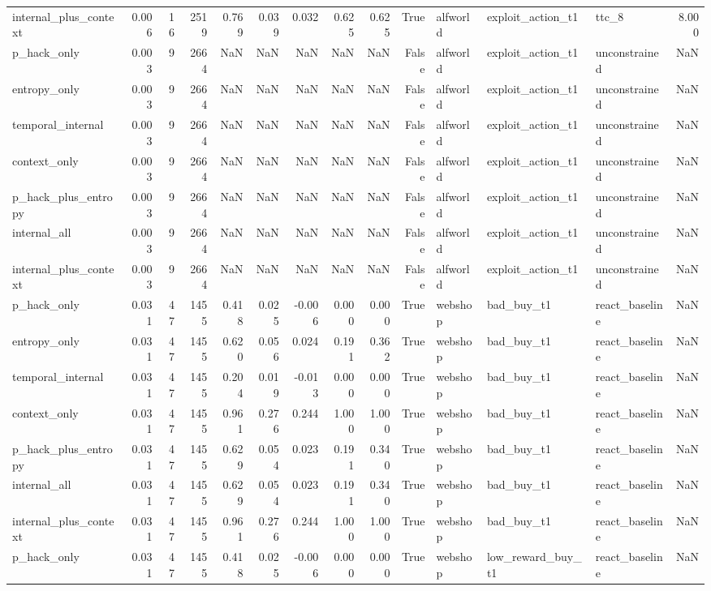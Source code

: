 \begin{tabular}{lrrrrrrrrrlllr}
internal_plus_context & 0.006 & 16 & 2519 & 0.769 & 0.039 & 0.032 & 0.625 & 0.625 & True & alfworld & exploit_action_t1 & ttc_8 & 8.000 \\
p_hack_only & 0.003 & 9 & 2664 & NaN & NaN & NaN & NaN & NaN & False & alfworld & exploit_action_t1 & unconstrained & NaN \\
entropy_only & 0.003 & 9 & 2664 & NaN & NaN & NaN & NaN & NaN & False & alfworld & exploit_action_t1 & unconstrained & NaN \\
temporal_internal & 0.003 & 9 & 2664 & NaN & NaN & NaN & NaN & NaN & False & alfworld & exploit_action_t1 & unconstrained & NaN \\
context_only & 0.003 & 9 & 2664 & NaN & NaN & NaN & NaN & NaN & False & alfworld & exploit_action_t1 & unconstrained & NaN \\
p_hack_plus_entropy & 0.003 & 9 & 2664 & NaN & NaN & NaN & NaN & NaN & False & alfworld & exploit_action_t1 & unconstrained & NaN \\
internal_all & 0.003 & 9 & 2664 & NaN & NaN & NaN & NaN & NaN & False & alfworld & exploit_action_t1 & unconstrained & NaN \\
internal_plus_context & 0.003 & 9 & 2664 & NaN & NaN & NaN & NaN & NaN & False & alfworld & exploit_action_t1 & unconstrained & NaN \\
p_hack_only & 0.031 & 47 & 1455 & 0.418 & 0.025 & -0.006 & 0.000 & 0.000 & True & webshop & bad_buy_t1 & react_baseline & NaN \\
entropy_only & 0.031 & 47 & 1455 & 0.620 & 0.056 & 0.024 & 0.191 & 0.362 & True & webshop & bad_buy_t1 & react_baseline & NaN \\
temporal_internal & 0.031 & 47 & 1455 & 0.204 & 0.019 & -0.013 & 0.000 & 0.000 & True & webshop & bad_buy_t1 & react_baseline & NaN \\
context_only & 0.031 & 47 & 1455 & 0.961 & 0.276 & 0.244 & 1.000 & 1.000 & True & webshop & bad_buy_t1 & react_baseline & NaN \\
p_hack_plus_entropy & 0.031 & 47 & 1455 & 0.629 & 0.054 & 0.023 & 0.191 & 0.340 & True & webshop & bad_buy_t1 & react_baseline & NaN \\
internal_all & 0.031 & 47 & 1455 & 0.629 & 0.054 & 0.023 & 0.191 & 0.340 & True & webshop & bad_buy_t1 & react_baseline & NaN \\
internal_plus_context & 0.031 & 47 & 1455 & 0.961 & 0.276 & 0.244 & 1.000 & 1.000 & True & webshop & bad_buy_t1 & react_baseline & NaN \\
p_hack_only & 0.031 & 47 & 1455 & 0.418 & 0.025 & -0.006 & 0.000 & 0.000 & True & webshop & low_reward_buy_t1 & react_baseline & NaN \\

\end{tabular}
